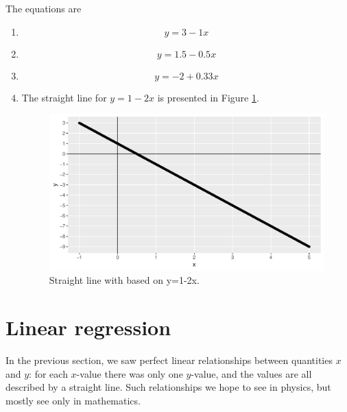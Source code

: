 \documentclass[]{book}\usepackage[]{graphicx}\usepackage[]{color}
\makeatletter
\def\maxwidth{ %
  \ifdim\Gin@nat@width>\linewidth
    \linewidth
  \else
    \Gin@nat@width
  \fi
}
\newenvironment{knitrout}{}{} %
\makeatother
\begin{document}
The equations are
\begin{enumerate}
\item 
\begin{equation}
y = 3 - 1 x
\end{equation}
\item
\begin{equation}
y = 1.5 - 0.5 x
\end{equation}
\item
\begin{equation}
y = -2 + 0.33 x
\end{equation}
\item
The straight line for $y=1 - 2x$ is presented in Figure \ref{fig:lm_7}.

\begin{knitrout}
\color{fgcolor}\begin{figure}

{\centering \includegraphics[width=\maxwidth]{figure/lm_7-1} 

}

\caption[Straight line with based on y=1-2x]{Straight line with based on y=1-2x.}\label{fig:lm_7}
\end{figure}


\end{knitrout}
\end{enumerate}
\section{Linear regression}

In the previous section, we saw perfect linear relationships between quantities $x$ and $y$: for each $x$-value there was only one $y$-value, and the values are all described by a straight line. Such relationships we hope to see in physics, but mostly see only in mathematics.
\end{document}

